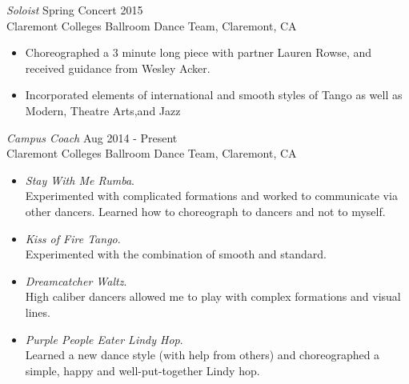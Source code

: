 {\sl Soloist} \hfill Spring Concert 2015 \\
Claremont Colleges Ballroom Dance Team, Claremont, CA
\begin{itemize} \itemsep -2pt
  \item Choreographed a 3 minute long piece with partner Lauren
  Rowse, and received guidance from Wesley Acker.
  \item Incorporated elements of international and smooth styles  of Tango as well as Modern, Theatre Arts,and Jazz
\end{itemize}


{\sl Campus Coach} \hfill Aug 2014 - Present \\
Claremont Colleges Ballroom Dance Team, Claremont, CA
\begin{itemize}
  \item \textit{Stay With Me Rumba}.\\
   Experimented with
  complicated formations and worked to communicate via other
  dancers. Learned how to choreograph to dancers and not to
  myself.
  \item \textit{Kiss of Fire Tango}.\\
  Experimented with the combination of smooth and standard.
  \item \textit{Dreamcatcher Waltz}.\\
  High caliber dancers allowed
  me to play with complex formations and visual lines.
  \item \textit{Purple People Eater Lindy Hop}. \\
  Learned a new dance style (with help from others) and choreographed a simple,
  happy and well-put-together Lindy hop.
\end{itemize}